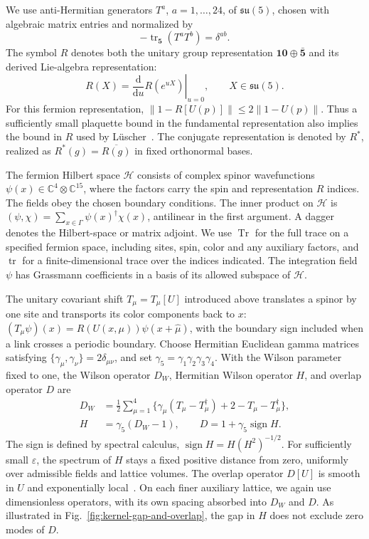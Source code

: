 \documentclass[11pt,a4paper]{article}
\theoremstyle{remark}
\DeclareMathOperator{\Tr}{Tr}
\DeclareMathOperator{\tr}{tr}
\newcommand{\dd}{\mathrm d}
\newcommand{\eps}{\varepsilon}
\begin{document}
We use anti-Hermitian generators \(T^a\), \(a=1,\ldots,24\),
of \(\mathfrak{su}(5)\), chosen with algebraic matrix entries
and normalized by
\begin{equation}
 -\tr_{\mathbf5}(T^aT^b)=\delta^{ab}.
\end{equation}
The symbol \(R\) denotes both the unitary group representation
\(\mathbf{10}\oplus\bar{\mathbf5}\) and its derived
Lie-algebra representation:
\begin{equation}
 R(X)=\left.\frac{\dd}{\dd u}R(e^{uX})\right|_{u=0},
 \qquad X\in\mathfrak{su}(5).
\end{equation}
For this fermion representation,
\(\|1-R[U(p)]\|\le2\|1-U(p)\|\).
Thus a sufficiently small plaquette bound in the fundamental
representation also implies the bound in \(R\) used by
L\"uscher~\cite[eq.~(2.1)]{LuscherNonabelian}.
The conjugate representation is denoted by \(R^*\), realized as
\(R^*(g)=\overline{R(g)}\) in fixed orthonormal bases.

The fermion Hilbert space \(\mathcal H\) consists of complex spinor
wavefunctions
\(\psi(x)\in\mathbb C^4\otimes\mathbb C^{15}\), where the
factors carry the spin and representation \(R\) indices.
The fields obey the chosen boundary conditions. The inner product on \(\mathcal H\) is
\((\psi,\chi)=\sum_{x\in\Gamma}\psi(x)^\dagger\chi(x)\),
antilinear in the first argument. A dagger denotes the
Hilbert-space or matrix adjoint. We use \(\Tr\) for the full
trace on a specified fermion space, including sites, spin,
color and any auxiliary factors, and \(\tr\) for a
finite-dimensional trace over the indices indicated.
The integration field \(\psi\) has Grassmann coefficients in a
basis of its allowed subspace of \(\mathcal H\).

The unitary covariant shift \(T_\mu=T_\mu[U]\) introduced above
translates a spinor by one site and transports its color components
back to \(x\):
\((T_\mu\psi)(x)=R(U(x,\mu))\psi(x+\hat\mu)\), with
the boundary sign included when a link crosses a periodic boundary.
Choose Hermitian Euclidean gamma matrices satisfying
\(\{\gamma_\mu,\gamma_\nu\}=2\delta_{\mu\nu}\), and
set \(\gamma_5=\gamma_1\gamma_2\gamma_3\gamma_4\).
With the Wilson parameter fixed to one, the Wilson operator
\(D_W\), Hermitian Wilson operator \(H\), and overlap operator \(D\) are
\begin{equation}
 \begin{split}
 D_W&=\frac12\sum_{\mu=1}^4
 \{\gamma_\mu(T_\mu-T_\mu^\dagger)
                  +2-T_\mu-T_\mu^\dagger\},\\
 H&=\gamma_5(D_W-1),\qquad
 D=1+\gamma_5\operatorname{sign}H.
 \end{split}
 \label{eq:wilson}
\end{equation}
The sign is defined by spectral calculus,
\(\operatorname{sign}H=H(H^2)^{-1/2}\). For sufficiently small \(\eps\), the spectrum of \(H\) stays a fixed
positive distance from zero, uniformly over admissible fields and
lattice volumes. The overlap operator \(D[U]\) is smooth in \(U\)
and exponentially local~\cite{HJL,Neuberger}. On each finer
auxiliary lattice, we again use dimensionless operators, with
its own spacing absorbed into \(D_W\) and \(D\). As illustrated in Fig.~\ref{fig:kernel-gap-and-overlap},
the gap in $H$ does not exclude zero modes of $D$.
\end{document}
